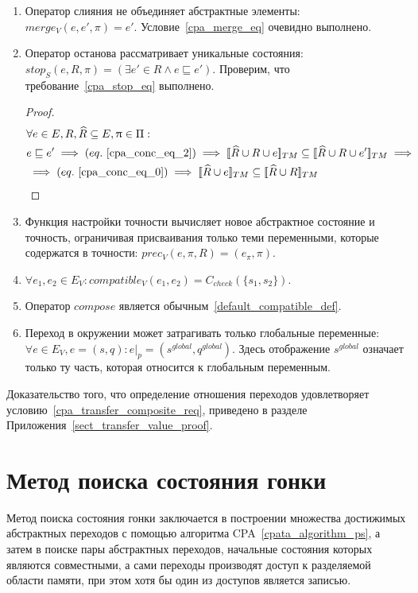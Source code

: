 \begin{enumerate}
\item Оператор слияния не объединяет абстрактные элементы: $merge_V(e, e', \pi) = e'$. Условие~\ref{cpa_merge_eq} очевидно выполнено.

\item Оператор останова рассматривает уникальные состояния: $stop_S(e, R, \pi) = (\exists e' \in R \land e \sqsubseteq e')$.
Проверим, что требование~\ref{cpa_stop_eq} выполнено.
\begin{proof}
\begin{align*}
&\forall e \in E, R, \widehat{R} \subseteq E, \pi \in \Pi: \\
& e \sqsubseteq e' \implies (eq.~\ref{cpa_conc_eq_2}) \implies \conctm{\widehat{R} \cup R \cup e} \subseteq \conctm{\widehat{R} \cup R \cup e'} \implies \\
& \implies (eq.~\ref{cpa_conc_eq_0}) \implies \conctm{\widehat{R} \cup e} \subseteq \conctm{\widehat{R} \cup R} 
\end{align*}
\end{proof}

\item Функция настройки точности вычисляет новое абстрактное состояние и точность, ограничивая присваивания только теми переменными, которые содержатся в точности: $prec_V(e, \pi, R) = (e_{\pi}, \pi)$.

\item $\forall e_1, e_2 \in E_V: compatible_V(e_1,e_2) = C_{check}(\{s_1, s_2\})$.

\item Оператор $compose$ является обычным~\ref{default_compatible_def}.

\item Переход в окружении может затрагивать только глобальные переменные: $\forall e \in E_V, e=(s,q):e|_p=(s^{global},q^{global})$.
 Здесь отображение $s^{global}$ означает только ту часть, которая относится к глобальным переменным.
\end{enumerate}

Доказательство того, что определение отношения переходов удовлетворяет условию~\ref{cpa_transfer_composite_req}, приведено в разделе Приложения~\ref{sect_transfer_value_proof}. 

\section{Метод поиска состояния гонки}
\label{sect_race_theory}

Метод поиска состояния гонки заключается в построении множества достижимых абстрактных переходов с помощью алгоритма CPA~\ref{cpata_algorithm_ps}, а затем в поиске пары абстрактных переходов, начальные состояния которых являются совместными, а сами переходы производят доступ к разделяемой области памяти, при этом хотя бы один из доступов является записью.

